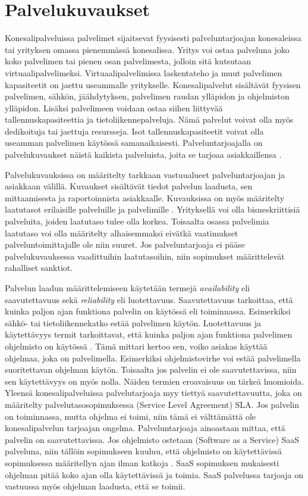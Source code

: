 \section{Palvelukuvaukset}
Konesalipalveluissa palvelimet sijaitsevat fyysisesti palveluntarjoajan konesaleissa tai yrityksen omassa pienemmässä konesalissa. Yritys voi ostaa palveluna joko koko palvelimen tai pienen osan palvelimesta, jolloin sitä kutsutaan virtuaalipalvelimeksi. Virtuaalipalvelimissa laskentateho ja muut palvelimen kapasiteetit on jaettu useammalle yritykselle. Konesalipalvelut sisältävät fyysisen palvelimen, sähkön, jäähdytyksen, palvelimen raudan ylläpidon ja ohjelmiston ylläpidon. Lisäksi palvelimeen voidaan ostaa siihen liittyvää tallennuskapasiteettia ja tietoliikennepalveluja. Nämä palvelut voivat olla myös dedikoituja tai jaettuja resursseja. Isot tallennuskapasiteetit voivat olla useamman palvelimen käytössä samanaikaisesti. Palveluntarjoajalla on palvelukuvaukset näistä kaikista palveluista, joita se tarjoaa asiakkaillensa \citep{handbook}.

Palvelukuvauksissa on määritelty tarkkaan vastuualueet palveluntarjoajan ja asiakkaan välillä. Kuvaukset sisältävät tiedot palvelun laadusta, sen mittaamisesta ja raportoinnista asiakkaalle. Kuvauksissa on myös määritelty laatutasot erilaisille palveluille ja palvelimille \citep{handbook}. Yrityksellä voi olla bisneskriittisiä palveluita, joiden laatutaso tulee olla korkea. Toisaalta osassa palvelimia laatutaso voi olla määritelty alhaisemmaksi eivätkä vaatimukset palveluntoimittajalle ole niin suuret. Jos palveluntarjoaja ei pääse palvelukuvauksessa vaadittuihin laatutasoihin, niin sopimukset määrittelevät rahalliset sanktiot.

Palvelun laadun määrittelemiseen käytetään termejä \emph{availability} eli saavutettavuus sekä \emph{reliability} eli luotettavuus. Saavutettavuus tarkoittaa, että kuinka paljon ajan funktiona palvelin on käytössä eli toiminnassa. Esimerkiksi sähkö- tai tietoliikennekatko estää palvelimen käytön. Luotettavuus ja käytettävyys termit tarkoittavat, että kuinka paljon ajan funktiona palvelimen ohjelmisto on käytössä \citep{service_availability} \citep{itil}. Tämä mittari kertoo sen, voiko asiakas käyttää ohjelmaa, joka on palvelimella. Esimerkiksi ohjelmistovirhe voi estää palvelimella suoritettavan ohjelman käytön. Toisaalta jos palvelin ei ole saavutettavissa, niin sen käytettävyys on myös nolla. Näiden termien eroavaisuus on tärkeä huomioida. Yleensä konesalipalveluissa palvelutarjoaja myy tiettyä saavutettavuutta, joka on määritelty palvelutasosopimuksessa (Service Level Agreement) SLA. Jos palvelin on toiminnassa, mutta ohjelma ei toimi, niin tämä ei välttämättä ole konesalipalvelun tarjoajan ongelma. Palveluntarjoaja ainoastaan mittaa, että palvelin on saavutettavissa. Jos ohjelmisto ostetaan (Software as a Service) SaaS palveluna, niin tällöin sopimukseen kuuluu, että ohjelmisto on käytettävissä sopimuksessa määritellyn ajan ilman katkoja \citep{software_service}. SaaS sopimuksen mukaisesti ohjelman pitää koko ajan olla käytettävissä ja toimia. SaaS palvelussa tarjoaja on vastuussa myös ohjelman laadusta, että se toimii.

